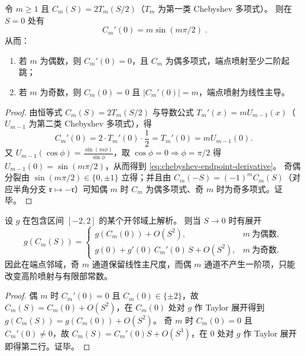 \begin{proposition}\label{prop:chebyshev-endpoint-derivative-splitting}
令 \(m\ge 1\) 且 \(C_m(S)=2T_m(S/2)\)（\(T_m\) 为第一类 Chebyshev 多项式）。
则在 \(S=0\) 处有
\begin{equation}\label{eq:chebyshev-endpoint-derivative}
\boxed{\;
C_m'(0)=m\sin(m\pi/2)\; }.
\end{equation}
从而：
\begin{enumerate}
  \item 若 \(m\) 为偶数，则 \(C_m'(0)=0\)，且 \(C_m\) 为偶多项式，端点喷射至少二阶起跳；
  \item 若 \(m\) 为奇数，则 \(C_m(0)=0\) 且 \(|C_m'(0)|=m\)，端点喷射为线性主导。
\end{enumerate}
\end{proposition}
\begin{proof}
由恒等式 \(C_m(S)=2T_m(S/2)\) 与导数公式 \(T_m'(x)=mU_{m-1}(x)\)（\(U_{m-1}\) 为第二类 Chebyshev 多项式），得
\[
C_m'(0)=2\cdot T_m'(0)\cdot \frac12=T_m'(0)=mU_{m-1}(0).
\]
又 \(U_{m-1}(\cos\phi)=\frac{\sin(m\phi)}{\sin\phi}\)，取 \(\cos\phi=0\Rightarrow \phi=\pi/2\) 得 \(U_{m-1}(0)=\sin(m\pi/2)\)，从而得到 \eqref{eq:chebyshev-endpoint-derivative}。
奇偶分裂由 \(\sin(m\pi/2)\in\{0,\pm 1\}\) 立得；并且由 \(C_m(-S)=(-1)^m C_m(S)\)（对应半角分支 \(\mathfrak{r}\mapsto-\mathfrak{r}\)）可知偶 \(m\) 时 \(C_m\) 为偶多项式、奇 \(m\) 时为奇多项式。证毕。
\end{proof}

\begin{corollary}\label{cor:chebyshev-endpoint-jet-regularization}
设 \(g\) 在包含区间 \([-2,2]\) 的某个开邻域上解析。
则当 \(S\to 0\) 时有展开
\[
g(C_m(S))=
\begin{cases}
g(C_m(0)) + O(S^2), & m\ \text{为偶数},\\[4pt]
g(0) + g'(0)\,C_m'(0)\,S+O(S^2), & m\ \text{为奇数}.
\end{cases}
\]
因此在端点邻域，奇 \(m\) 通道保留线性主尺度，而偶 \(m\) 通道不产生一阶项，只能改变高阶喷射与有限部常数。
\end{corollary}
\begin{proof}
偶 \(m\) 时 \(C_m'(0)=0\) 且 \(C_m(0)\in\{\pm 2\}\)，故 \(C_m(S)=C_m(0)+O(S^2)\)，在 \(C_m(0)\) 处对 \(g\) 作 Taylor 展开得到 \(g(C_m(S))=g(C_m(0))+O(S^2)\)。
奇 \(m\) 时 \(C_m(0)=0\) 且 \(C_m'(0)\neq 0\)，故 \(C_m(S)=C_m'(0)S+O(S^3)\)，在 \(0\) 处对 \(g\) 作 Taylor 展开即得第二行。证毕。
\end{proof}

